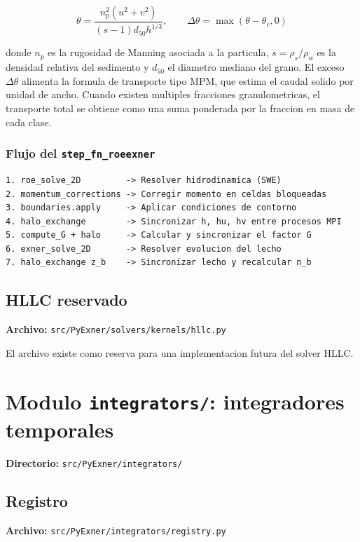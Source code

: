 \documentclass[11pt,a4paper]{article}
\newcommand{\code}[1]{\texttt{#1}}
\begin{document}
\[
  \theta = \frac{n_p^2(u^2 + v^2)}{(s-1)d_{50}h^{1/3}},
  \qquad
  \Delta \theta = \max(\theta - \theta_c, 0)
\]

donde $n_p$ es la rugosidad de Manning asociada a la particula, $s = \rho_s / \rho_w$ es la
densidad relativa del sedimento y $d_{50}$ el diametro mediano del grano. El exceso
$\Delta\theta$ alimenta la formula de transporte tipo MPM, que estima el caudal solido por
unidad de ancho. Cuando existen multiples fracciones granulometricas, el transporte total se
obtiene como una suma ponderada por la fraccion en masa de cada clase.

\subsubsection{Flujo del \code{step\_fn\_roeexner}}

\begin{Verbatim}[fontsize=\small]
1. roe_solve_2D         -> Resolver hidrodinamica (SWE)
2. momentum_corrections -> Corregir momento en celdas bloqueadas
3. boundaries.apply     -> Aplicar condiciones de contorno
4. halo_exchange        -> Sincronizar h, hu, hv entre procesos MPI
5. compute_G + halo     -> Calcular y sincronizar el factor G
6. exner_solve_2D       -> Resolver evolucion del lecho
7. halo_exchange z_b    -> Sincronizar lecho y recalcular n_b
\end{Verbatim}

\subsection{HLLC reservado}

\textbf{Archivo:} \code{src/PyExner/solvers/kernels/hllc.py}

El archivo existe como reserva para una implementacion futura del solver HLLC.

\section{Modulo \code{integrators/}: integradores temporales}

\textbf{Directorio:} \code{src/PyExner/integrators/}

\subsection{Registro}

\textbf{Archivo:} \code{src/PyExner/integrators/registry.py}
\end{document}
